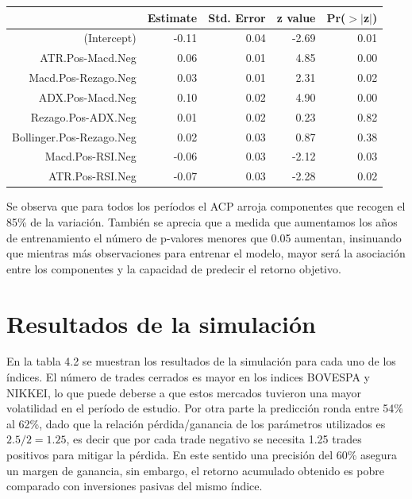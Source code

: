 \documentclass[a4paper,12pt]{Latex/Classes/PhDthesisPSnPDF}
\begin{document}
\newpage
\begin{center}
\begin{table}[ht]
\centering
\begin{tabular}{rrrrr}
  \hline
 & Estimate & Std. Error & z value & Pr($>$$|$z$|$) \\ 
  \hline
(Intercept) & -0.11 & 0.04 & -2.69 & 0.01 \\ 
  ATR.Pos-Macd.Neg & 0.06 & 0.01 & 4.85 & 0.00 \\ 
  Macd.Pos-Rezago.Neg & 0.03 & 0.01 & 2.31 & 0.02 \\ 
  ADX.Pos-Macd.Neg & 0.10 & 0.02 & 4.90 & 0.00 \\ 
  Rezago.Pos-ADX.Neg & 0.01 & 0.02 & 0.23 & 0.82 \\ 
  Bollinger.Pos-Rezago.Neg & 0.02 & 0.03 & 0.87 & 0.38 \\ 
  Macd.Pos-RSI.Neg & -0.06 & 0.03 & -2.12 & 0.03 \\ 
  ATR.Pos-RSI.Neg & -0.07 & 0.03 & -2.28 & 0.02 \\ 
   \hline
\end{tabular}
\end{table}\end{center}

Se observa que para todos los períodos el ACP arroja componentes que recogen el 85\% de la variación. También se aprecia que a medida que aumentamos los años de entrenamiento el número de p-valores menores que 0.05 aumentan, insinuando que mientras más observaciones para entrenar el modelo, mayor será la asociación entre los componentes y la capacidad de predecir el retorno objetivo.

\section{Resultados de la simulación}


En la tabla 4.2 se muestran los resultados de la simulación para cada uno de los índices. El número de trades cerrados es mayor en los indices BOVESPA y NIKKEI, lo que puede deberse a que estos mercados tuvieron una mayor volatilidad en el período de estudio. Por otra parte la predicción ronda entre 54\% al 62\%, dado que la relación pérdida/ganancia de los parámetros utilizados es $2.5/2 = 1.25$, es decir que por cada trade negativo se necesita 1.25 trades positivos para mitigar la pérdida. En este sentido una precisión del 60\% asegura un margen de ganancia, sin embargo, el retorno acumulado obtenido es pobre comparado con inversiones pasivas del mismo índice. 
\end{document}
